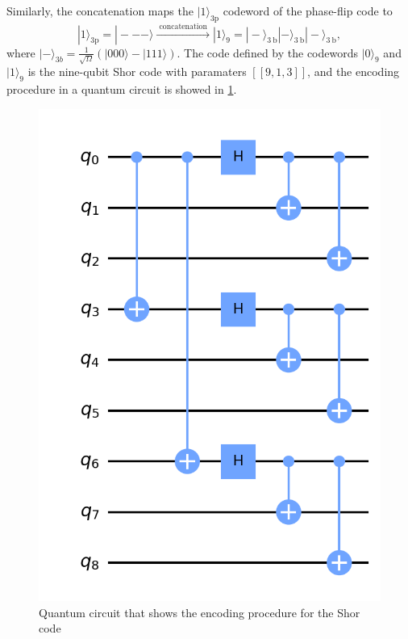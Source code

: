 Similarly, the concatenation maps the $|1\rangle_{3 \mathrm{p}}$ codeword of the phase-flip code to
$$
|1\rangle_{3 \mathrm{p}}=|---\rangle \stackrel{\text { concatenation }}{\longrightarrow}|1\rangle_{9}=|-\rangle_{3 \mathrm{~b}}|-\rangle_{3 \mathrm{~b}}|-\rangle_{3 \mathrm{~b}},
$$
where $|-\rangle_{3b}=\frac{1}{\sqrt{\Omega}}(|000\rangle-|111\rangle)$. The code defined by the codewords $|0\rangle_{9}$ and $|1\rangle_{9}$ is the nine-qubit Shor code with paramaters $[[9, 1, 3]]$, and the encoding procedure in a quantum circuit is showed in \ref{fig:Shorenc}. 
\begin{figure}[h!]
    \centering
    \includegraphics[scale=0.6]{Mainmatter/images/Shor_enc.png}
    \caption{Quantum circuit that shows the encoding procedure for the Shor code}
    \label{fig:Shorenc}
\end{figure}


